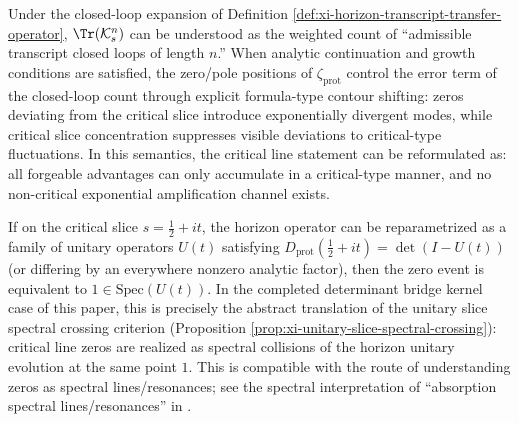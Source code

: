 \begin{remark}\label{rem:xi-hzom-zero-soundness-duality}
Under the closed-loop expansion of Definition \ref{def:xi-horizon-transcript-transfer-operator}, \(\Tr(\mathcal{K}_s^n)\) can be understood as the weighted count of ``admissible transcript closed loops of length \(n\).''
When analytic continuation and growth conditions are satisfied, the zero/pole positions of \(\zeta_{\mathrm{prot}}\) control the error term of the closed-loop count through explicit formula-type contour shifting: zeros deviating from the critical slice introduce exponentially divergent modes, while critical slice concentration suppresses visible deviations to critical-type fluctuations.
In this semantics, the critical line statement can be reformulated as: all forgeable advantages can only accumulate in a critical-type manner, and no non-critical exponential amplification channel exists.
\end{remark}

\begin{corollary}\label{cor:xi-hzom-unitary-slice}
If on the critical slice \(s=\tfrac12+it\), the horizon operator can be reparametrized as a family of unitary operators \(U(t)\) satisfying
\(
D_{\mathrm{prot}}(\tfrac12+it)=\det(I-U(t))
\)
(or differing by an everywhere nonzero analytic factor),
then the zero event is equivalent to \(1\in\mathrm{Spec}(U(t))\).
In the completed determinant bridge kernel case of this paper, this is precisely the abstract translation of the unitary slice spectral crossing criterion (Proposition \ref{prop:xi-unitary-slice-spectral-crossing}): critical line zeros are realized as spectral collisions of the horizon unitary evolution at the same point \(1\).
This is compatible with the route of understanding zeros as spectral lines/resonances; see the spectral interpretation of ``absorption spectral lines/resonances'' in \cite{Connes1999TraceFormulaNCG}.
\end{corollary}

